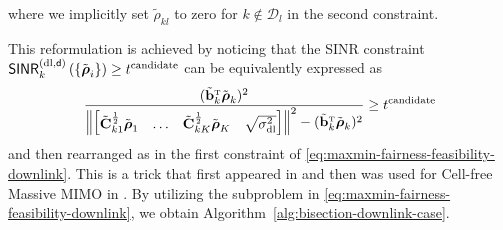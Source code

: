 where we implicitly set $\tilde{\rho}_{kl}$ to zero for $k\notin\mathcal{D}_l$ in the second constraint.

\pagebreak 
This reformulation is achieved by noticing that the SINR constraint $\mathsf{SINR}_{k}^{({\rm dl},\mathsf{d})}\left(\left\{\tilde{\boldsymbol{\rho}}_i\right\}\right) \geq t^{\rm candidate}$ can be equivalently expressed as
\begin{equation}
\frac{ ( \tilde{\vect{b}}_k^{\Ttran}\tilde{\boldsymbol{\rho}}_k )^2 }{
\left \Vert \begin{bmatrix}   \tilde{\vect{C}}_{k1}^{\frac12}\tilde{\boldsymbol{\rho}}_1 & \ldots & \tilde{\vect{C}}_{kK}^{\frac12}\tilde{\boldsymbol{\rho}}_K & \sqrt{\sigmaDL} \end{bmatrix} \right \Vert^2 - 
(\tilde{\vect{b}}_k^{\Ttran}\tilde{\boldsymbol{\rho}}_k)^2} \geq t^{\rm candidate}
\end{equation}
and then rearranged as in the first constraint of \eqref{eq:maxmin-fairness-feasibility-downlink}. This is a trick that first appeared in \cite{Bengtsson2001a} and then was used for Cell-free Massive MIMO in \cite{Ngo2017b}. By utilizing the subproblem in \eqref{eq:maxmin-fairness-feasibility-downlink}, we obtain Algorithm~\ref{alg:bisection-downlink-case}. 


